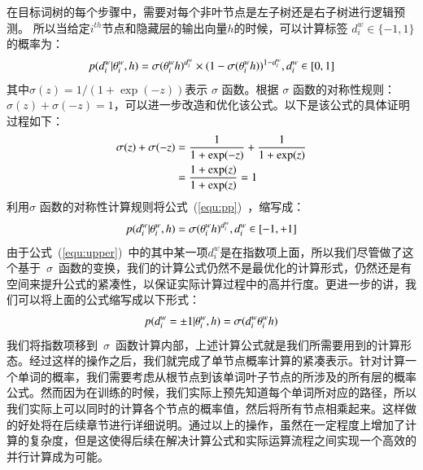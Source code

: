 在目标词树的每个步骤中，需要对每个非叶节点是左子树还是右子树进行逻辑预测。 所以当给定$ i^{th} $节点和隐藏层的输出向量$h$的时候，可以计算标签 $d^w_i\in \{-1,1\}$的概率为：
 \begin{equation}\label{equ:pp}
 \setlength{\abovedisplayskip}{6pt}
\setlength{\belowdisplayskip}{6pt}
p(d^w_i|\theta_{i}^w,h) =\sigma(\theta_{i}^w h)^{d_i^w}\times(1-\sigma(\theta_{i}^w h))^{1-{d_i^w}},d_i^w \in [0,1]
\end{equation}
其中$ \sigma(z)= 1 /(1 + \exp(-z))$表示 $\sigma$ 函数。根据 $\sigma$ 函数的对称性规则：$\sigma(z)+ \sigma(-z)=1$，可以进一步改造和优化该公式。以下是该公式的具体证明过程如下：
\begin{equation}\label{equ:sig}
\setlength{\abovedisplayskip}{6pt}
\setlength{\belowdisplayskip}{6pt}
\begin{split}
\sigma(z)+ \sigma(-z)  &=\frac{1}{1 + \exp(-z)}+\frac{1}{1 + \exp(z)}\\
  &=\frac{1 + \exp(z)}{1 + \exp(z)}=1
\end{split}
\end{equation}
利用$\sigma$ 函数的对称性计算规则将公式~(\ref{equ:pp})~，缩写成：
 \begin{equation}\label{equ:upper}
\setlength{\abovedisplayskip}{6pt}
\setlength{\belowdisplayskip}{6pt}
p(d^w_i|\theta_{i}^w,h) =\sigma(\theta_{i}^w h)^{d_i^w}, d_i^w \in [-1,+1]
\end{equation}
由于公式~(\ref{equ:upper})~中的其中某一项${d_i^w}$是在指数项上面，所以我们尽管做了这个基于~$\sigma$~函数的变换，我们的计算公式仍然不是最优化的计算形式，仍然还是有空间来提升公式的紧凑性，以保证实际计算过程中的高并行度。更进一步的讲，我们可以将上面的公式缩写成以下形式：
\begin{equation}
\setlength{\abovedisplayskip}{6pt}
\setlength{\belowdisplayskip}{6pt}
p(d^w_i=\pm 1|\theta_{i}^w,h) = \sigma({d_i^w}\theta_{i}^w h)
\end{equation}
我们将指数项移到~$\sigma$~函数计算内部，上述计算公式就是我们所需要用到的计算形态。经过这样的操作之后，我们就完成了单节点概率计算的紧凑表示。针对计算一个单词的概率，我们需要考虑从根节点到该单词叶子节点的所涉及的所有层的概率公式。然而因为在训练的时候，我们实际上预先知道每个单词所对应的路径，所以我们实际上可以同时的计算各个节点的概率值，然后将所有节点相乘起来。这样做的好处将在后续章节进行详细说明。通过以上的操作，虽然在一定程度上增加了计算的复杂度，但是这使得后续在解决计算公式和实际运算流程之间实现一个高效的并行计算成为可能。

